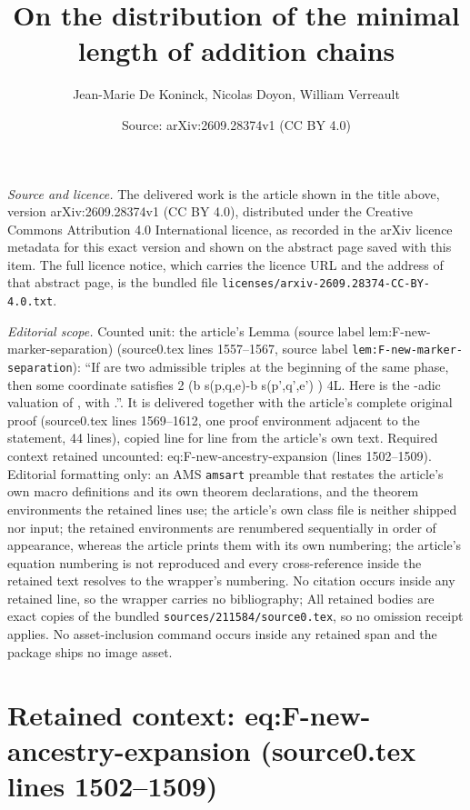 \documentclass[10pt,a4paper]{amsart}
\title[On the distribution of the minimal length of addition chains]{On the distribution of the minimal length of addition chains}
\author{Jean-Marie De Koninck, Nicolas Doyon, William Verreault}
\date{Source: arXiv:2609.28374v1 (CC BY 4.0)}
\theoremstyle{plain}
\theoremstyle{definition}
\begin{document}
\maketitle

\noindent\emph{Source and licence.} The delivered work is the article shown in the title above, version arXiv:2609.28374v1 (CC BY 4.0), distributed under the Creative Commons Attribution 4.0 International licence, as recorded in the arXiv licence metadata for this exact version and shown on the abstract page saved with this item. The full licence notice, which carries the licence URL and the address of that abstract page, is the bundled file \texttt{licenses/arxiv-2609.28374-CC-BY-4.0.txt}.
\par\smallskip

\noindent\textit{Editorial scope.} Counted unit: the article's Lemma (source label lem:F-new-marker-separation) (source0.tex lines 1557--1567, source label \texttt{lem:F-new-marker-separation}): ``If are two admissible triples at the beginning of the same phase, then some coordinate satisfies 2 (b s(p,q,e)-b s(p',q',e') ) 4L. Here is the -adic valuation of , with .''. It is delivered together with the article's complete original proof (source0.tex lines 1569--1612, one proof environment adjacent to the statement, 44 lines), copied line for line from the article's own text. Required context retained uncounted: eq:F-new-ancestry-expansion (lines 1502--1509). Editorial formatting only: an AMS \texttt{amsart} preamble that restates the article's own macro definitions and its own theorem declarations, and the theorem environments the retained lines use; the article's own class file is neither shipped nor input; the retained environments are renumbered sequentially in order of appearance, whereas the article prints them with its own numbering; the article's equation numbering is not reproduced and every cross-reference inside the retained text resolves to the wrapper's numbering. No citation occurs inside any retained line, so the wrapper carries no bibliography; All retained bodies are exact copies of the bundled \texttt{sources/211584/source0.tex}, so no omission receipt applies. No asset-inclusion command occurs inside any retained span and the package ships no image asset.


\section*{Retained context: eq:F-new-ancestry-expansion (source0.tex lines 1502--1509)}
\end{document}
